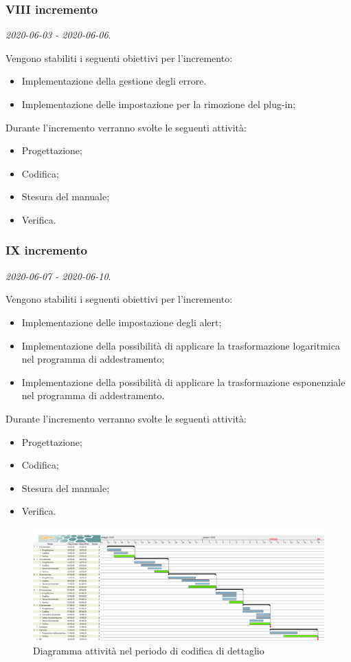 \documentclass[../piano-di-progetto.tex]{subfiles}
\begin{document}
\subsubsection{VIII incremento}
\emph{2020-06-03 - 2020-06-06}. 
 
 Vengono stabiliti i seguenti obiettivi per l'incremento:
 \begin{itemize}
    \item Implementazione della gestione degli errore.
    \item Implementazione delle impostazione per la rimozione del plug-in;

 \end{itemize}

Durante l'incremento verranno svolte le seguenti attività: 
\begin{itemize}
    \item Progettazione;
    \item Codifica;
    \item Stesura del manuale;
    \item Verifica.
\end{itemize}

\subsubsection{IX incremento}
\emph{2020-06-07 - 2020-06-10}. 
 
 Vengono stabiliti i seguenti obiettivi per l'incremento:
 \begin{itemize}
    \item Implementazione delle impostazione degli alert;
    \item Implementazione della possibilità di applicare la trasformazione logaritmica nel programma di addestramento;
    \item Implementazione della possibilità di applicare la trasformazione esponenziale nel programma di addestramento.

 \end{itemize}

Durante l'incremento verranno svolte le seguenti attività: 
\begin{itemize}
    \item Progettazione;
    \item Codifica;
    \item Stesura del manuale;
    \item Verifica.
\end{itemize}



\newpage
\begin{landscape}
    \begin{figure}[H]
        \centering
        \includegraphics[width=24cm]{img/codifica.png}
        \caption{Diagramma attività nel periodo di codifica di dettaglio}
      \end{figure}
\end{landscape}
\end{document}
